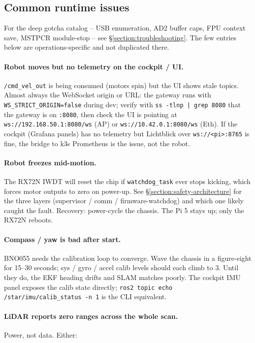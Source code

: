 \subsection{Common runtime issues}

For the deep gotcha catalog -- USB enumeration, AD2 buffer caps, FPU
context save, MSTPCR module-stop -- see
\S\ref{section:troubleshooting}. The few entries below are
operations-specific and not duplicated there.

\paragraph{Robot moves but no telemetry on the cockpit / UI.}
\texttt{/cmd\_vel\_out} is being consumed (motors spin) but the UI
shows stale topics. Almost always the WebSocket origin or URL: the
gateway runs with \texttt{WS\_STRICT\_ORIGIN=false} during dev;
verify with \texttt{ss -tlnp | grep 8080} that the gateway is on
\texttt{:8080}, then check the UI is pointing at
\texttt{ws://192.168.50.1:8080/ws} (AP) or
\texttt{ws://10.42.0.1:8080/ws} (Eth). If the cockpit (Grafana
panels) has no telemetry but Lichtblick over
\texttt{ws://<pi>:8765} is fine, the bridge to k3s Prometheus is the
issue, not the robot.

\paragraph{Robot freezes mid-motion.}
The RX72N IWDT will reset the chip if \texttt{watchdog\_task} ever
stops kicking, which forces motor outputs to zero on power-up. See
\S\ref{section:safety-architecture} for the three layers
(supervisor / comm / firmware-watchdog) and which one likely caught
the fault. Recovery: power-cycle the chassis. The Pi 5 stays up; only
the RX72N reboots.

\paragraph{Compass / yaw is bad after start.}
BNO055 needs the calibration loop to converge. Wave the chassis in a
figure-eight for 15--30 seconds; sys / gyro / accel calib levels
should each climb to 3. Until they do, the EKF heading drifts and
SLAM matches poorly. The cockpit IMU panel exposes the calib state
directly; \texttt{ros2 topic echo /star/imu/calib\_status -n 1} is
the CLI equivalent.

\paragraph{LiDAR reports zero ranges across the whole scan.}
Power, not data. Either:

